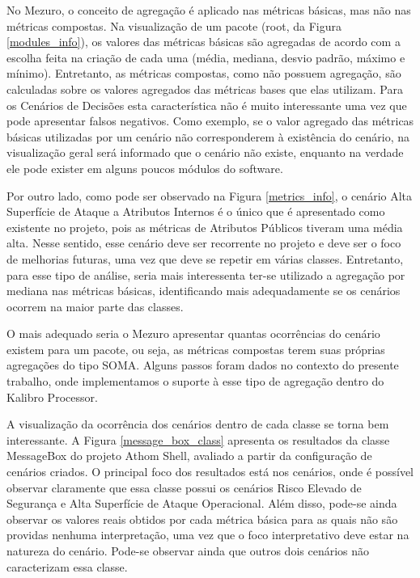 No Mezuro, o conceito de agregação é aplicado nas métricas básicas, mas não nas métricas compostas. Na visualização de um pacote (root, da Figura \ref{modules_info}), os valores das métricas básicas são agregadas de acordo com a escolha feita na criação de cada uma (média, mediana, desvio padrão, máximo e mínimo). Entretanto, as métricas compostas, como não possuem agregação, são calculadas sobre os valores agregados das métricas bases que elas utilizam. Para os Cenários de Decisões esta característica não é muito interessante uma vez que pode apresentar falsos negativos. Como exemplo, se o valor agregado das métricas básicas utilizadas por um cenário não corresponderem à existência do cenário, na visualização geral será informado que o cenário não existe, enquanto na verdade ele pode exister em alguns poucos módulos do software. 

Por outro lado, como pode ser observado na Figura \ref{metrics_info}, o cenário Alta Superfície de Ataque a Atributos Internos é o único que é apresentado como existente no projeto, pois as métricas de Atributos Públicos tiveram uma média alta. Nesse sentido, esse cenário deve ser recorrente no projeto e deve ser o foco de melhorias futuras, uma vez que deve se repetir em várias classes. Entretanto, para esse tipo de análise, seria mais interessenta ter-se utilizado a agregação por mediana nas métricas básicas, identificando mais adequadamente se os cenários ocorrem na maior parte das classes.

O mais adequado seria o Mezuro apresentar quantas ocorrências do cenário existem para um pacote, ou seja, as métricas compostas terem suas próprias agregações do tipo SOMA. Alguns passos foram dados no contexto do presente trabalho, onde implementamos o suporte à esse tipo de agregação dentro do Kalibro Processor. 

A visualização da ocorrência dos cenários dentro de cada classe se torna bem interessante. A Figura \ref{message_box_class} apresenta os resultados da classe MessageBox do projeto Athom Shell, avaliado a partir da configuração de cenários criados. O principal foco dos resultados está nos cenários, onde é possível observar claramente que essa classe possui os cenários Risco Elevado de Segurança e Alta Superfície de Ataque Operacional. Além disso, pode-se ainda observar os valores reais obtidos por cada métrica básica para as quais não são providas nenhuma interpretação, uma vez que o foco interpretativo deve estar na natureza do cenário. Pode-se observar ainda que outros dois cenários não caracterizam essa classe.

